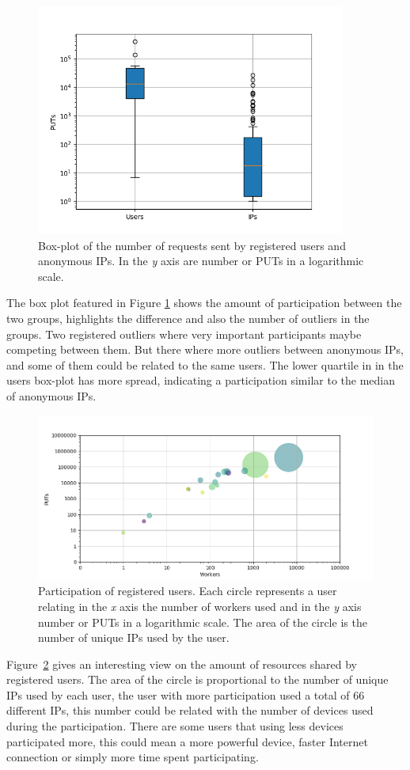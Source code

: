 \documentclass{llncs}
\begin{document}
%
\begin{figure}[htb]
    \centering
        \includegraphics[width=4in]{img/puts_box.png}
    \caption{ Box-plot of the number of requests sent by registered users and anonymous IPs.
     In the \emph{y} axis are number or PUTs in a logarithmic scale.
    }
    \label{fig:box}
\end{figure}
%
The box plot featured in Figure \ref{fig:box} shows the amount of participation between the two groups, highlights
the difference and also the number of outliers in the groups. Two registered 
outliers where very important participants maybe competing between them. But
there where more outliers between anonymous IPs, and some of them could be related
to the same users. The lower quartile in in the users box-plot has more
spread, indicating a participation similar to the median of anonymous IPs.

%
\begin{figure}[htb]
    \centering
        \includegraphics[width=5in]{img/workers_put_ip.png}
    \caption{ Participation of registered users. Each circle represents a user relating  
        in the \emph{x} axis the number of workers used and in the \emph{y} axis 
        number or PUTs in a logarithmic scale. The area of the circle is the number 
        of unique IPs used by the user.
    }
    \label{fig:worker-put-ips}
\end{figure}
%
Figure~\ref{fig:worker-put-ips} gives an interesting view on the amount of
resources shared by registered users. The area of the circle is proportional
to the number of unique IPs used by each user, the user with more participation
used a total of 66 different IPs, this number could be related with the number
of devices used during the participation. There are some users that using less
devices participated more, this could mean a more powerful device, faster 
Internet connection or simply more time spent participating.
\end{document}
